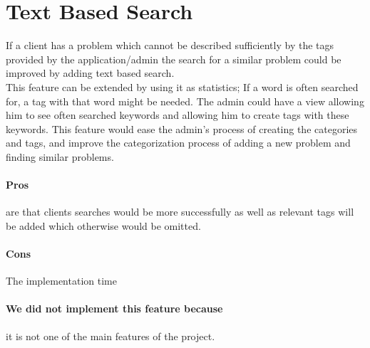 \section{Text Based Search}
\label{sec:text_based_search}
If a client has a problem which cannot be described sufficiently by the tags provided by the application/admin the search for a similar problem could be improved by adding text based search. \\
This feature can be extended by using it as statistics; If a word is often searched for, a tag with that word might be needed. 
The admin could have a view allowing him to see often searched keywords and allowing him to create tags with these keywords.
This feature would ease the admin's process of creating the categories and tags, and improve the categorization process of adding a new problem and finding similar problems.

\paragraph{Pros} are that clients searches would be more successfully as well as relevant tags will be added which otherwise would be omitted.
\paragraph{Cons} The implementation time
\paragraph{We did not implement this feature because} it is not one of the main features of the project. 